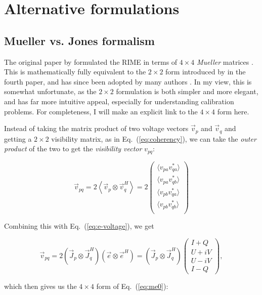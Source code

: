 \documentclass[referee]{aa}
\newcommand{\herm}{H}
\newcommand{\jones}[2]{\vec {#1}_{#2}}
\newcommand{\jonesT}[2]{\vec {#1}^{\herm}_{#2}}
\begin{document}
\section{\label{sec:formulations}Alternative formulations}

\subsection{Mueller vs. Jones formalism\label{sec:mueller}}

The original paper by \citet{ME1} formulated the RIME in terms of $4\times4$ {\em Mueller} matrices \citep{Muller}. This is mathematically fully equivalent to the $2\times2$ form introduced by \citet{ME4} in the fourth paper, and has since been adopted by many authors \citep{JEN:note185,tms,SB:imageplane,Rau:DDEs}. In my view, this is somewhat unfortunate, as the $2\times2$ formulation is both simpler and more elegant, and has far more intuitive appeal, especially for understanding calibration problems. For completeness, I will make an explicit link to the $4\times4$ form here.

Instead of taking the matrix product of two voltage vectors $\vec v_p$ and $\vec v_q$ and getting a $2\times2$ visibility matrix, as in Eq.~(\ref{eq:coherency}), we can take the {\em outer product} of the two to get the {\em visibility vector} $v_{pq}$:

\[
\vec v_{pq} = 2 \left< \vec v_p \otimes \vec v^\herm_q \right > = 2 \left ( 
\begin{array}{c}
    \langle v_{pa}v^*_{qa}\rangle \\ \langle v_{pa}v^*_{qb}\rangle \\
    \langle v_{pb}v^*_{qa}\rangle \\ \langle v_{pb}v^*_{qb}\rangle \\
\end{array} 
\right ) 
\]

Combining this with Eq.~(\ref{eq:e-voltage}), we get

\[
    \vec v_{pq} = 2 ( \jones{J}{p} \otimes \jonesT{J}{q} ) (\vec e \otimes \vec e^\herm )
 = ( \jones{J}{p} \otimes \jonesT{J}{q} ) 
\left ( \begin{array}{c}
I+Q \\ U+iV \\ U-iV \\ I-Q
\end{array} \right ), 
\]

which then gives us the $4\times4$ form of Eq.~(\ref{eq:me0}):
\end{document}
